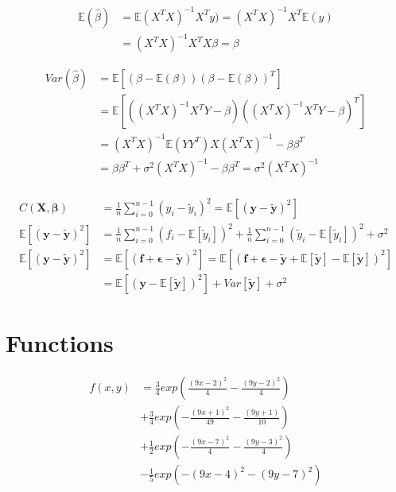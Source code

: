 \documentclass[english,notitlepage,reprint,nofootinbib]{revtex4-1}  %
\begin{document}
\begin{align*}\label{eq:E_beta}
    \mathbb{E}(\hat{\beta}) &= \mathbb{E}(X^TX)^{-1}X^Ty) = (X^TX)^{-1}X^T\mathbb{E}(y) \\&= (X^TX)^{-1}X^TX\beta = \beta
\end{align*}

\begin{align*}\label{eq:var_beta}
    Var(\hat{\beta}) &= \mathbb{E} [(\beta - \mathbb{E}(\beta))(\beta - \mathbb{E}(\beta))^T] \\
    &= \mathbb{E}[((X^T X)^{-1} X^T Y - \beta) ((X^T X)^{-1} X^T Y - \beta)^T] \\
    &= (X^T X)^{-1} \mathbb{E}(Y Y^T) X (X^T X)^{-1} - \beta \beta^T \\
    &= \beta \beta^T + \sigma^2 (X^T X)^{-1} - \beta \beta^T = \sigma^2 (X^T X)^{-1}
\end{align*}
\\

\begin{align*}\label{eq:BIAS_VAR}
    C(\mathbf{X}, \mathbf{\beta}) &= \frac{1}{n} \sum_{i = 0}^{n - 1} (y_i - \tilde y_i)^2 = \mathbb{E}[(\textbf{y} - \mathbf{\tilde y})^2] \\
    \mathbb{E}[(\textbf{y} - \mathbf{\tilde y})^2] &=  \frac{1}{n} \sum_{i = 0}^{n - 1} (f_i - \mathbb{E}[\tilde y_i])^2 + \frac{1}{n} \sum_{i = 0}^{n - 1} (\tilde y_i - \mathbb{E}[\tilde y_i])^2 + \sigma^2 \\
    \mathbb{E}[(\textbf{y} - \mathbf{\tilde y})^2] &= \mathbb{E}[(\mathbf{f} + \mathbf{\epsilon} - \mathbf{\tilde y})^2] = \mathbb{E}[(\mathbf{f} + \mathbf{\epsilon} - \mathbf{\tilde y} + \mathbb{E}[\mathbf{\tilde y}] - \mathbb{E}[\mathbf{\tilde y}])^2] \\
    &= \mathbb{E}[(\textbf{y} - \mathbb{E}[\mathbf{\tilde y}])^2] + Var[\mathbf{\tilde y}] + \sigma^2
\end{align*}


\section{Functions}\label{sec:FUNCTIONS}

\begin{align*}\label{eq:FrankeFunction}
    f(x,y) &= \frac{3}{4} exp \left( \frac{(9x -2)^2}{4} - \frac{(9y -2)^2}{4}  \right) \\
    &+  \frac{3}{4} exp \left( -\frac{(9x + 1)^2}{49} - \frac{(9y + 1)}{10} \right) \\
    &+ \frac{1}{2} exp \left( -\frac{(9x -7)^2}{4} - \frac{(9y - 3)^2}{4} \right) \\
    &- \frac{1}{5} exp \left( - (9x - 4)^2 - (9y - 7)^2 \right)
\end{align*}
\end{document}
